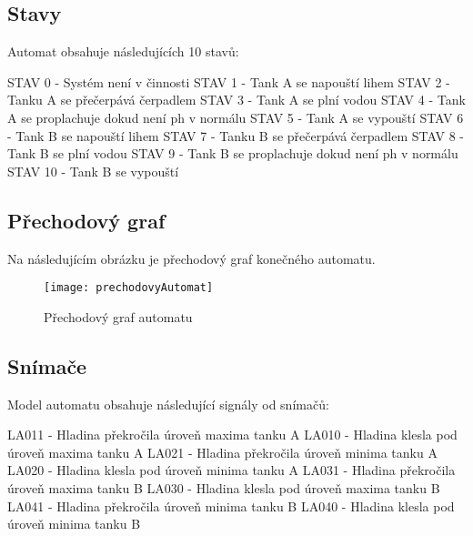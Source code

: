 \documentclass[12pt, a4paper]{article}
\begin{document}
\subsection{Stavy}
Automat obsahuje následujících 10 stavů:

STAV 0 - Systém není v činnosti \newline 
STAV 1 - Tank A se napouští lihem \newline 
STAV 2 - Tanku A se přečerpává čerpadlem \newline 
STAV 3 - Tank A se plní vodou \newline 
STAV 4 - Tank A se proplachuje dokud není ph v normálu \newline 
STAV 5 - Tank A se vypouští \newline 
STAV 6 - Tank B se napouští lihem \newline 
STAV 7 - Tanku B se přečerpává čerpadlem \newline 
STAV 8 - Tank B se plní vodou \newline 
STAV 9 - Tank B se proplachuje dokud není ph v normálu \newline 
STAV 10 - Tank B se vypouští 

\newpage
\subsection{Přechodový graf}
Na následujícím obrázku je přechodový graf konečného automatu.
\begin{figure}[h]
\centering 
\texttt{[image: prechodovyAutomat]}
\caption{Přechodový graf automatu}
\end{figure}

\subsection{Snímače}
Model automatu obsahuje následující signály od snímačů:
 
LA011 - Hladina překročila úroveň maxima tanku A \newline 
LA010 - Hladina klesla pod úroveň maxima tanku A \newline 
LA021 - Hladina překročila úroveň minima tanku A \newline 
LA020 - Hladina klesla pod úroveň minima tanku A \newline 
LA031 - Hladina překročila úroveň maxima tanku B \newline
LA030 - Hladina klesla pod úroveň maxima tanku B \newline 
LA041 - Hladina překročila úroveň minima tanku B \newline 
LA040 - Hladina klesla pod úroveň minima tanku B
\end{document}
